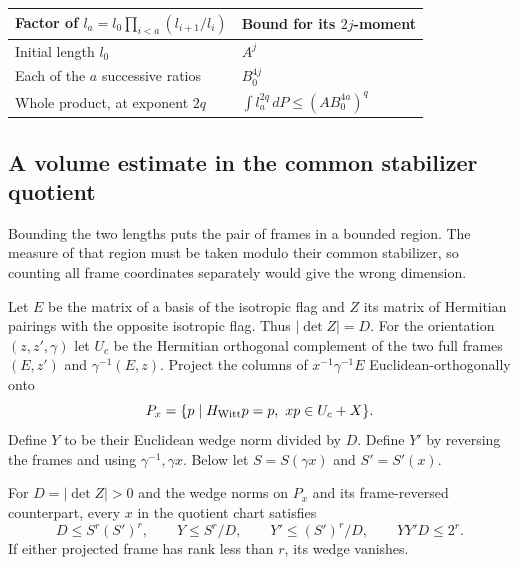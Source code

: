\begin{construction}
\begin{tabular}{@{}ll@{}}\toprule
Factor of \(l_a=l_0\prod_{i<a}(l_{i+1}/l_i)\) & Bound for its \(2j\)-moment\\\midrule
Initial length \(l_0\) & \(A^j\)\\
Each of the \(a\) successive ratios & \(B_0^{4j}\)\\\midrule
Whole product, at exponent \(2q\) &
\(\displaystyle\int l_a^{2q}\,dP\le (A B_0^{4a})^q\)\\\bottomrule
\end{tabular}
\caption{Combining frame-length moments at the standard character. H\"older uses \(j=(a+1)q\) for the \(a+1\) factors, within the common range for the two words.}\label{fig:frame-length-moment-factors}
\end{construction}

\subsection{A volume estimate in the common stabilizer quotient}

Bounding the two lengths puts the pair of frames in a bounded region. The measure of that region must be taken modulo their common stabilizer, so counting all frame coordinates separately would give the wrong dimension.

Let \(E\) be the matrix of a basis of the isotropic flag and
\(Z\) its matrix of Hermitian pairings with the opposite
isotropic flag. Thus \(|\det Z|=D\). For the orientation
\((z,z',\gamma)\) let \(U_c\) be the Hermitian orthogonal
complement of the two full frames \((E,z')\) and
\(\gamma^{-1}(E,z)\). Project the columns of
\(x^{-1}\gamma^{-1}E\) Euclidean-orthogonally onto
\[
 P_x=\{p\mid H_{\rm Witt}p=p,\ xp\in U_c+X\}.
\]
Define \(Y\) to be their Euclidean wedge norm divided by
\(D\). Define \(Y'\) by reversing the frames and using
\(\gamma^{-1},\gamma x\). Below let \(S=S(\gamma x)\) and
\(S'=S'(x)\). \begin{lemma}\label{lem:paired-frame-wedges}
For \(D=|\det Z|>0\) and the wedge norms on \(P_x\) and its
frame-reversed counterpart, every \(x\) in the quotient chart satisfies
\[
 D\le S^r(S')^r,\qquad Y\le S^r/D,\qquad
 Y'\le(S')^r/D,\qquad YY'D\le2^r.
\]
If either projected frame has rank less than \(r\), its wedge vanishes.
\end{lemma}

